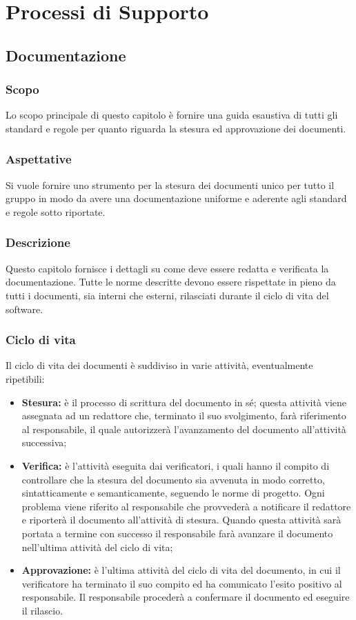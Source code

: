 \section{Processi di Supporto}

	\subsection{Documentazione}

		\subsubsection{Scopo}
			Lo scopo principale di questo capitolo è fornire una guida esaustiva di tutti gli standard e regole per quanto riguarda la stesura ed approvazione dei documenti.
		\subsubsection{Aspettative}
			Si vuole fornire uno strumento per la stesura dei documenti unico per tutto il gruppo in modo da avere una documentazione uniforme e aderente agli standard e regole sotto riportate.
		\subsubsection{Descrizione}
			Questo capitolo fornisce i dettagli su come deve essere redatta e verificata la documentazione. Tutte le norme descritte devono essere rispettate in pieno da tutti i documenti, sia interni che esterni, rilasciati durante il ciclo di vita del software.
		\subsubsection{Ciclo di vita}
			Il ciclo di vita dei documenti è suddiviso in varie attività, eventualmente ripetibili:
			\begin{itemize}
				\item \textbf{Stesura:} è il processo di scrittura del documento in sé; questa attività viene assegnata ad un redattore che, terminato il suo svolgimento, farà riferimento al responsabile, il quale autorizzerà l'avanzamento del documento all'attività successiva;
				\item \textbf{Verifica:} è l'attività eseguita dai verificatori, i quali hanno il compito di controllare che la stesura del documento sia avvenuta in modo corretto, sintatticamente e semanticamente, seguendo le norme di progetto. Ogni problema viene riferito al responsabile che provvederà a notificare il redattore e riporterà il documento all'attività di stesura. Quando questa attività sarà portata a termine con successo il responsabile farà avanzare il documento nell'ultima attività del ciclo di vita;
				\item \textbf{Approvazione:} è l'ultima attività del ciclo di vita del documento, in cui il verificatore ha terminato il suo compito ed ha comunicato l'esito positivo al responsabile. Il responsabile procederà a confermare il documento ed eseguire il rilascio.
			\end{itemize}
